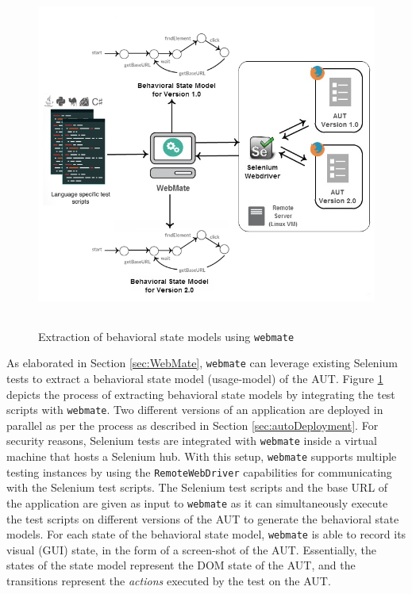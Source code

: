 \begin{figure}[h]
\makeatletter 
\makeatother
    \centering
  \includegraphics[width=5.5in,height=4.5in]{./Figures/WebMate_state_extraction.png}

\caption{Extraction of behavioral state models using \texttt{webmate}}
 \label{fig:webmateExtraction} 
\end{figure}

As elaborated in Section \ref{sec:WebMate}, \texttt{webmate} can leverage existing Selenium tests to extract a behavioral state model (usage-model) of the AUT. Figure \ref{fig:webmateExtraction} depicts the process of extracting behavioral state models by integrating the test scripts with \texttt{webmate}. Two different versions of an application are deployed in parallel as per the process as described in Section \ref{sec:autoDeployment}. For security reasons, Selenium tests are integrated with \texttt{webmate} inside a virtual machine that hosts a Selenium hub. With this setup, \texttt{webmate} supports multiple testing instances by using the \texttt{RemoteWebDriver} capabilities for communicating with the Selenium test scripts. The Selenium test scripts and the base URL of the application are given as input to \texttt{webmate} as it can simultaneously execute the test scripts on different versions of the AUT to generate the behavioral state models. For each state of the behavioral state model, \texttt{webmate} is able to record its visual (GUI) state, in the form of a screen-shot of the AUT. Essentially, the states of the state model represent the DOM state of the AUT, and the transitions represent the \textit{actions} executed by the test on the AUT.


